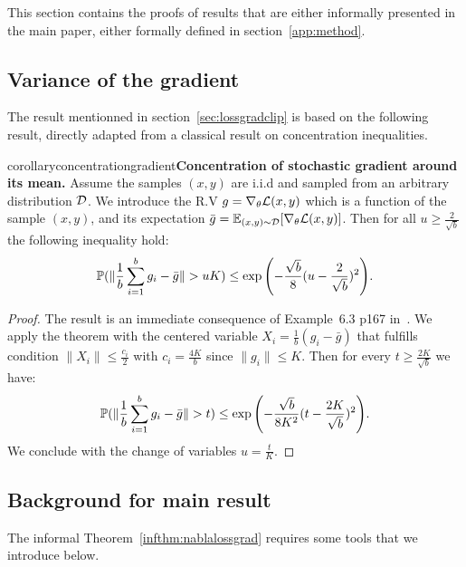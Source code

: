 This section contains the proofs of results that are either informally presented in the main paper, either formally defined in section~\ref{app:method}.  

\subsection{Variance of the gradient}\label{app:vargrad}
    The result mentionned in section~\ref{sec:lossgradclip} is based on the following result, directly adapted from a classical result on concentration inequalities.  
      
    \begin{restatable}{corollary}{concentrationgradient}{\normalfont\textbf{Concentration of stochastic gradient around its mean.}}\label{concentrationgradient}
        Assume the samples $(x,y)$ are i.i.d and sampled from an arbitrary distribution $\mathcal{D}$. We introduce the R.V $g=\nabla_{\theta}\mathcal{L}(x,y)$ which is a function of the sample $(x,y)$, and its expectation $\bar g=\mathbb{E}_{(x,y)\sim\mathcal{D}}[\nabla_{\theta}\mathcal{L}(x,y)]$. Then for all $u\geq \frac{2}{\sqrt{b}}$ the following inequality hold:
        \begin{equation}
            \Prob(\|\frac{1}{b}\sum_{i=1}^b g_i-\bar g\|>uK)\leq\exp{\left(-\frac{\sqrt{b}}{8}(u-\frac{2}{\sqrt{b}})^2\right)}.
        \end{equation}
    \end{restatable}
    \begin{proof}
    The result is an immediate consequence of Example~6.3 p167 in~\cite{boucheron2013concentration}.
    We apply the theorem with the centered variable $X_i=\frac{1}{b}(g_i-\bar g)$ that fulfills condition $\|X_i\|\leq \frac{c_i}{2}$ with $c_i=\frac{4K}{b}$ since $\|g_i\|\leq K$.  
        Then for every $t\geq \frac{2K}{\sqrt{b}}$ we have:
        \begin{equation}
            \Prob(\|\frac{1}{b}\sum_{i=1}^b g_i-\bar g\|>t)\leq\exp{\left(-\frac{\sqrt{b}}{8K^2}(t-\frac{2K}{\sqrt{b}})^2\right)}.
        \end{equation}
        We conclude with the change of variables $u=\frac{t}{K}$.  
    \end{proof}

\subsection{Background for main result}

    The informal Theorem~\ref{infthm:nablalossgrad} requires some tools that we introduce below.

